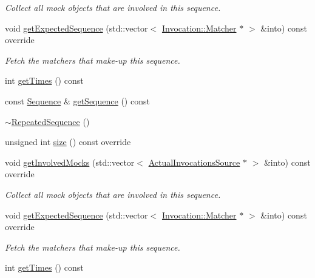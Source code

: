\begin{DoxyCompactItemize}
\begin{DoxyCompactList}\small\item\em Collect all mock objects that are involved in this sequence. \end{DoxyCompactList}\item 
void \mbox{\hyperlink{classfakeit_1_1RepeatedSequence_a65b5f62fe0ba9da31b99f28c1a2e53f2}{get\+Expected\+Sequence}} (std\+::vector$<$ \mbox{\hyperlink{structfakeit_1_1Invocation_1_1Matcher}{Invocation\+::\+Matcher}} $\ast$ $>$ \&into) const override
\begin{DoxyCompactList}\small\item\em Fetch the matchers that make-\/up this sequence. \end{DoxyCompactList}\item 
int \mbox{\hyperlink{classfakeit_1_1RepeatedSequence_a08eba3d6b4d7740e6a999a75f142948c}{get\+Times}} () const
\item 
const \mbox{\hyperlink{classfakeit_1_1Sequence}{Sequence}} \& \mbox{\hyperlink{classfakeit_1_1RepeatedSequence_ad85825e1b9a47002d468c85f822d7f5e}{get\+Sequence}} () const
\item 
\mbox{\hyperlink{classfakeit_1_1RepeatedSequence_aa45714780e496cf02e8e35f27de5b617}{$\sim$\+Repeated\+Sequence}} ()
\item 
unsigned int \mbox{\hyperlink{classfakeit_1_1RepeatedSequence_a64d52ac14ca69a34e8188e856e6b51a6}{size}} () const override
\item 
void \mbox{\hyperlink{classfakeit_1_1RepeatedSequence_a4271add0945bdf443562df683e77777d}{get\+Involved\+Mocks}} (std\+::vector$<$ \mbox{\hyperlink{structfakeit_1_1ActualInvocationsSource}{Actual\+Invocations\+Source}} $\ast$ $>$ \&into) const override
\begin{DoxyCompactList}\small\item\em Collect all mock objects that are involved in this sequence. \end{DoxyCompactList}\item 
void \mbox{\hyperlink{classfakeit_1_1RepeatedSequence_a65b5f62fe0ba9da31b99f28c1a2e53f2}{get\+Expected\+Sequence}} (std\+::vector$<$ \mbox{\hyperlink{structfakeit_1_1Invocation_1_1Matcher}{Invocation\+::\+Matcher}} $\ast$ $>$ \&into) const override
\begin{DoxyCompactList}\small\item\em Fetch the matchers that make-\/up this sequence. \end{DoxyCompactList}\item 
int \mbox{\hyperlink{classfakeit_1_1RepeatedSequence_a08eba3d6b4d7740e6a999a75f142948c}{get\+Times}} () const

\end{DoxyCompactItemize}
